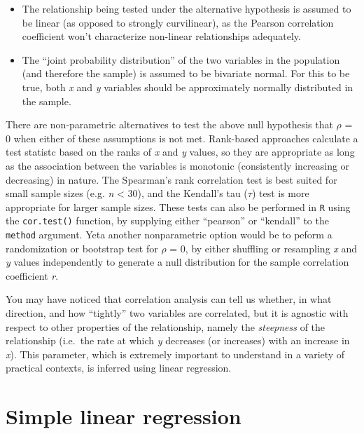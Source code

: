 \documentclass[]{book}
\begin{document}
\begin{itemize}
\item
  The relationship being tested under the alternative hypothesis is assumed to be linear (as opposed to strongly curvilinear), as the Pearson correlation coefficient won't characterize non-linear relationships adequately.
\item
  The ``joint probability distribution'' of the two variables in the population (and therefore the sample) is assumed to be bivariate normal. For this to be true, both \emph{x} and \emph{y} variables should be approximately normally distributed in the sample.
\end{itemize}

There are non-parametric alternatives to test the above null hypothesis that \(\rho\) = 0 when either of these assumptions is not met. Rank-based approaches calculate a test statistc based on the ranks of \emph{x} and \emph{y} values, so they are appropriate as long as the association between the variables is monotonic (consistently increasing or decreasing) in nature. The Spearman's rank correlation test is best suited for small sample sizes (e.g. \emph{n} \textless{} 30), and the Kendall's tau (\(\tau\)) test is more appropriate for larger sample sizes. These tests can also be performed in \texttt{R} using the \texttt{cor.test()} function, by supplying either ``pearson'' or ``kendall'' to the \texttt{method} argument. Yeta another nonparametric option would be to peform a randomization or bootstrap test for \(\rho\) = 0, by either shuffling or resampling \emph{x} and \emph{y} values independently to generate a null distribution for the sample correlation coefficient \emph{r}.

You may have noticed that correlation analysis can tell us whether, in what direction, and how ``tightly'' two variables are correlated, but it is agnostic with respect to other properties of the relationship, namely the \emph{steepness} of the relationship (i.e.~the rate at which \emph{y} decreases (or increases) with an increase in \emph{x}). This parameter, which is extremely important to understand in a variety of practical contexts, is inferred using linear regression.

\hypertarget{simple-linear-regression}{%
\section{Simple linear regression}\label{simple-linear-regression}}
\end{document}
